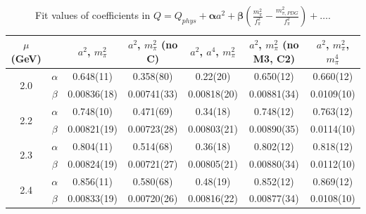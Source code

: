 \documentclass[12pt]{extarticle}
\begin{document}
\begin{table}[h!]
\begin{center}
\begin{tabular}{|c c|c|c|c|c|c|}
\hline
$\mu$ (GeV) &  & $a^2$, $m_\pi^2$& $a^2$, $m_\pi^2$ (no C)& $a^2$, $a^4$, $m_\pi^2$& $a^2$, $m_\pi^2$ (no M3, C2)& $a^2$, $m_\pi^2$, $m_\pi^4$\\
\hline
\multirow{2}{0.5in}{2.0} & $\alpha$ & 0.648(11)& 0.358(80)& 0.22(20)& 0.650(12)& 0.660(12)\\
 & $\beta$ & 0.00836(18)& 0.00741(33)& 0.00818(20)& 0.00881(34)& 0.0109(10)\\
\hline
\multirow{2}{0.5in}{2.2} & $\alpha$ & 0.748(10)& 0.471(69)& 0.34(18)& 0.748(12)& 0.763(12)\\
 & $\beta$ & 0.00821(19)& 0.00723(28)& 0.00803(21)& 0.00890(35)& 0.0114(10)\\
\hline
\multirow{2}{0.5in}{2.3} & $\alpha$ & 0.804(11)& 0.514(68)& 0.36(18)& 0.802(12)& 0.818(12)\\
 & $\beta$ & 0.00824(19)& 0.00721(27)& 0.00805(21)& 0.00880(34)& 0.0112(10)\\
\hline
\multirow{2}{0.5in}{2.4} & $\alpha$ & 0.856(11)& 0.580(68)& 0.48(19)& 0.852(12)& 0.869(12)\\
 & $\beta$ & 0.00833(19)& 0.00720(26)& 0.00816(22)& 0.00877(34)& 0.0108(10)\\
\hline
\end{tabular}
\caption{Fit values of coefficients in $Q = Q_{phys} + \mathbf{\alpha} a^2 + \mathbf{\beta}\left(\frac{m_\pi^2}{f_\pi^2}-\frac{m_{\pi,PDG}^2}{f_\pi^2}\right) + \ldots$.}
\end{center}
\end{table}




















\clearpage
\end{document}
